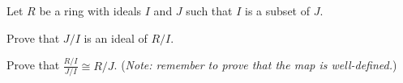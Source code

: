\newpage

\begin{problem}\label{problem-ring-isomorphism-3}
    Let $R$ be a ring with ideals $I$ and $J$ such that $I$ is a subset of $J$.
    \begin{partquestions}{\roman*}
        \item Prove that $J/I$ is an ideal of $R/I$.
        \item Prove that $\frac{R/I}{J/I} \cong R/J$.\newline
        (\textit{Note: remember to prove that the map is well-defined.})
    \end{partquestions}
\end{problem}
